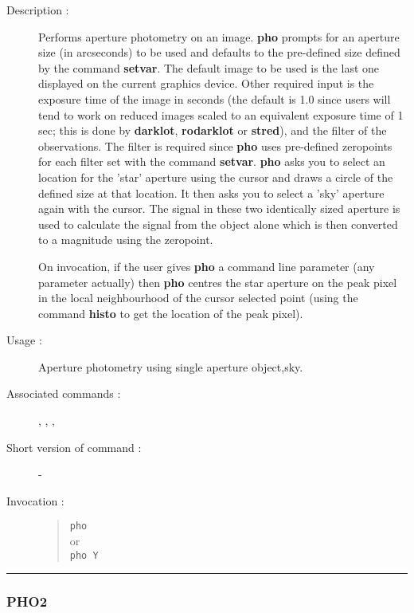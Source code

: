 \begin{description}

\item[Description :] Performs aperture photometry on an image.  {\bf
pho} prompts for an aperture size (in arcseconds) to be used and
defaults to the pre-defined size defined by the command {\bf setvar}.
The default image to be used is the last one displayed on the current
graphics device.  Other required input is the exposure time of the
image in seconds (the default is 1.0 since users will tend to work on
reduced images scaled to an equivalent exposure time of 1 sec; this is
done by {\bf darklot}, {\bf rodarklot} or {\bf stred}), and the filter
of the observations.  The filter is required since {\bf pho} uses
pre-defined zeropoints for each filter set with the command {\bf
setvar}. {\bf pho} asks you to select an location for the 'star'
aperture using the cursor and draws a circle of the defined size at
that location. It then asks you to select a 'sky' aperture again with
the cursor.  The signal in these two identically sized aperture is used
to calculate the signal from the object alone which is then converted
to a magnitude using the zeropoint.

On invocation, if the user gives {\bf pho} a command line parameter (any
parameter actually) then {\bf pho} centres the star aperture on the peak pixel
in the local neighbourhood of the cursor selected point (using the
command {\bf histo} to get the location of the peak pixel).
 
\item [Usage :] Aperture photometry using single aperture object,sky.

\item [Associated commands :] {\tt {}}, 
{\tt {}}, {\tt {}}, 
{\tt {}}

\item [Short version of command :] -

\item[Invocation :]

\begin{quote}{\tt  pho }\\
or \\
{\tt pho Y }
\end{quote}

\end{description}

\hrule 
\subsubsection*{\label{PHO2}PHO2}

